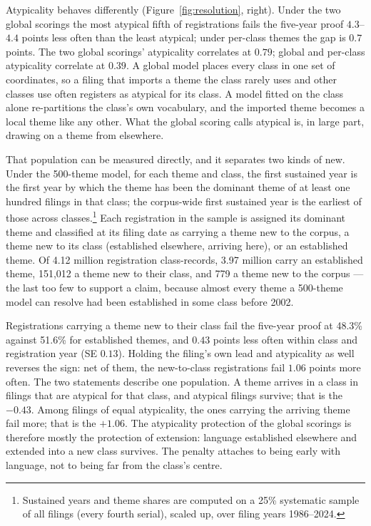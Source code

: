 \begin{table}[h]\centering\small
\caption{Failure contrasts at the five-year proof under three theme
scorings, on the identical registrations. Top-minus-bottom quintile,
quintiles cut within Nice class and registration year, no controls;
$n = 3{,}105{,}048$, base failure 52.3\%.}
\label{tab:resolution}

\end{table}

Atypicality behaves differently (Figure~\ref{fig:resolution}, right).
Under the two global scorings the most atypical fifth of registrations
fails the five-year proof $4.3$--$4.4$ points less often than the least
atypical; under per-class themes the gap is $0.7$ points. The two global
scorings' atypicality correlates at $0.79$; global and per-class
atypicality correlate at $0.39$. A global model places every class in one
set of coordinates, so a filing that imports a theme the class rarely uses
and other classes use often registers as atypical for its class. A model
fitted on the class alone re-partitions the class's own vocabulary, and
the imported theme becomes a local theme like any other. What the global
scoring calls atypical is, in large part, drawing on a theme from
elsewhere.

That population can be measured directly, and it separates two kinds of
new. Under the 500-theme model, for each theme and class, the first
sustained year is the first year by which the theme has been the dominant
theme of at least one hundred filings in that class; the corpus-wide first
sustained year is the earliest of those across classes.\footnote{Sustained
years and theme shares are computed on a 25\% systematic sample of all
filings (every fourth serial), scaled up, over filing years 1986--2024.}
Each registration in the sample is assigned its dominant theme and
classified at its filing date as carrying a theme new to the corpus, a
theme new to its class (established elsewhere, arriving here), or an
established theme. Of 4.12 million registration class-records, 3.97
million carry an established theme, 151{,}012 a theme new to their class,
and 779 a theme new to the corpus --- the last too few to support a
claim, because almost every theme a 500-theme model can resolve had been
established in some class before 2002.

Registrations carrying a theme new to their class fail the five-year proof
at 48.3\% against 51.6\% for established themes, and $0.43$ points less
often within class and registration year (SE $0.13$). Holding the
filing's own lead and atypicality as well reverses the sign: net of them,
the new-to-class registrations fail $1.06$ points more often. The two
statements describe one population. A theme arrives in a class in filings
that are atypical for that class, and atypical filings survive; that is
the $-0.43$. Among filings of equal atypicality, the ones carrying the
arriving theme fail more; that is the $+1.06$. The atypicality protection
of the global scorings is therefore mostly the protection of extension:
language established elsewhere and extended into a new class survives.
The penalty attaches to being early with language, not to being far from
the class's centre.


